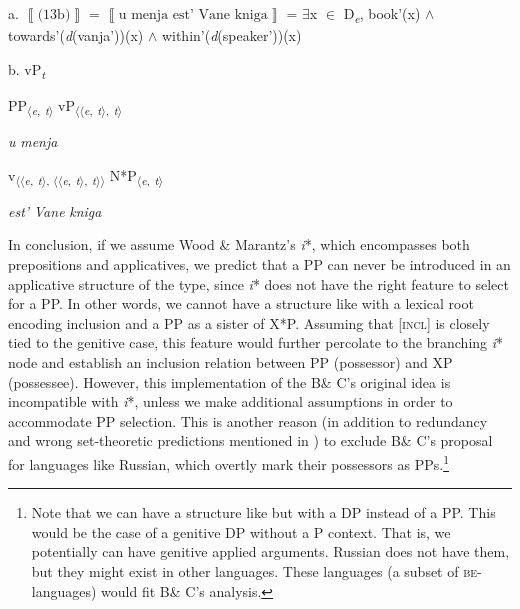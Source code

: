 \documentclass[output=paper,modfonts,nonflat]{langsci/langscibook}
\begin{document}
\ea%
    \label{ex:key:26}
    \gll\\
        \\
    \glt
    \z

          a.   $\left\llbracket \text{(13b)}\right\rrbracket $  =  $\left\llbracket \text{u menja est’ Vane kniga}\right\rrbracket $   = ${\exists}$x ${\in}$ D\textit{\textsubscript{e}}, book'(x) ${\wedge}$ towards'(\textit{d}(vanja'))(x) ${\wedge}$ within'(\textit{d}(speaker'))(x)

  b.  vP\textit{\textsubscript{t}}


  PP\textsubscript{${\langle}$}\textit{\textsubscript{e}}\textsubscript{,} \textit{\textsubscript{t}}\textsubscript{${\rangle}$}  vP\textsubscript{${\langle}{\langle}$}\textit{\textsubscript{e}}\textsubscript{,} \textit{\textsubscript{t}}\textsubscript{${\rangle}$,} \textit{\textsubscript{t}}\textsubscript{${\rangle}$}

  \textit{u} \textit{menja}

  v\textsubscript{${\langle}{\langle}$}\textit{\textsubscript{e}}\textsubscript{,} \textit{\textsubscript{t}}\textsubscript{${\rangle}$, ${\langle}{\langle}$}\textit{\textsubscript{e}}\textsubscript{,} \textit{\textsubscript{t}}\textsubscript{${\rangle}$,} \textit{\textsubscript{t}}\textsubscript{${\rangle}{\rangle}$}  N*P\textsubscript{${\langle}$}\textit{\textsubscript{e}}\textsubscript{,} \textit{\textsubscript{t}}\textsubscript{${\rangle}$}

  \textit{est’}  \textit{Vane} \textit{kniga}

In conclusion, if we assume Wood \& Marantz’s \textit{i}*, which encompasses both prepositions and applicatives, we predict that a PP can never be introduced in an applicative structure of the  type, since \textit{i}* does not have the right feature to select for a PP. In other words, we cannot have a structure like  with a lexical root encoding inclusion and a PP as a sister of X*P. Assuming that [\textsc{incl}] is closely tied to the genitive case, this feature would further percolate to the branching \textit{i}* node and establish an inclusion relation between PP (possessor) and XP (possessee). However, this implementation of the B\& C’s original idea is incompatible with \textit{i}*, unless we make additional assumptions in order to accommodate PP selection. This is another reason (in addition to redundancy and wrong set-theoretic predictions mentioned in ) to exclude B\& C’s proposal for languages like Russian, which overtly mark their possessors as PPs.\footnote{Note that we can have a structure like  but with a DP instead of a PP. This would be the case of a genitive DP without a P context. That is, we potentially can have genitive applied arguments. Russian does not have them, but they might exist in other languages. These languages (a subset of \textsc{be}{}-languages) would fit B\& C’s analysis.}    
\end{document}
